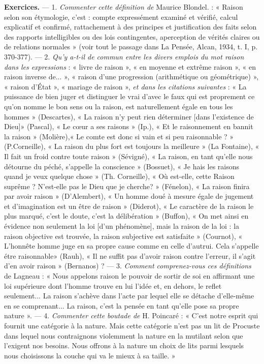 {\footnotesize
{\bf Exercices.} — 1. {\it Commenter cette définition de} Maurice Blondel. : « Raison
selon son étymologie, c’est : compte expressément examiné et vérifié, calcul
explicatif et confirmé, rattachement à des principes et justification des
faits selon des rapports intelligibles ou des lois contingentes, aperception
de vérités claires ou de relations normales » (voir tout le passage dans La
Pensée, Alcan, 1934, t. I, p. 370-377). — 2. {\it Qu'y a-t-il de commun entre les
divers emplois du mot raison dans les expressions} : « livre de raison », « en
moyenne et extrême raison », « en raison inverse de... », « raison d’une progression (arithmétique ou géométrique) », « raison d'État », « mariage de
raison », {\it et dans les citations suivantes} : « La puissance de bien juger et distinguer le vrai d'avec le faux qui est proprement ce qu’on nomme le bon sens
ou la raison, est naturellement égale en tous les hommes » (Descartes), « La
raison n’y peut rien déterminer [dans l'existence de Dieu]» (Pascal),
« Le cœur a ses raisons » (Ip.), « Et le raisonnement en bannit la raison »
(Molière),« Le comte est donc si vain et si peu raisonnable ? » (P.Corneille),
« La raison du plus fort est toujours la meilleure » (La Fontaine), « Il fait
un froid contre toute raison » (Sévigné), « La raison, en tant qu’elle nous
détourne du péché, s’appelle la conscience » (Bossuet), « Je hais les raisons
quand je veux quelque chose » (Th. Corneille), « Où est-elle, cette Raison
suprême ? N'est-elle pas le Dieu que je cherche? » (Fénelon), « La raison
finira par avoir raison » (D'Alembert), « Un homme doué à mesure égale
de jugement et d'imagination est un être de raison » (Diderot), « Le caractère de la raison le plus marqué, c’est le doute, c’est la délibération » (Buffon),
« On met ainsi en évidence non seulement la loi [d’un phénomène], mais la
raison de la loi : la raison objective est trouvée, la raison subjective est satisfaite » (Cournot), « L'honnête homme juge en sa propre cause comme en
celle d'autrui. Cela s'appelle étre raisonnable» (Rauh), « Il ne suffit pas
d'avoir raison contre l'erreur, il s'agit d'en avoir raison » (Bernanos) ? —
3. {\it Comment comprenez-vous ces définitions} de Lagneau : « Nous appelons raison le pouvoir de sortir de soi en affirmant une loi supérieure dont l’homme
trouve en lui l’idée et, en dehors, le reflet seulement... La raison s'achève
dans l’acte par lequel elle se détache d'elle-même en se comprenant... La raison, c'est la pensée en tant qu’elle pose sa propre nature ». — 4. {\it Commenter
cette boutade de} H. Poincaré : « C’est notre esprit qui fournit une catégorie à
la nature. Mais cette catégorie n’est pas un lit de Procuste dans lequel nous
contraignons violemment la nature en la mutilant selon que l’exigent nos
besoins. Nous offrons à la nature un choix de lits parmi lesquels nous
choisissons la couche qui va le mieux à sa taille. »

}
